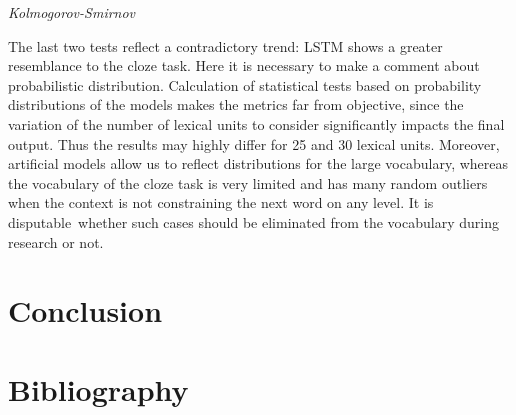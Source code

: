 \documentclass[a4paper]{article}
\newcommand{\head}[1]{\vspace{0.5em}\emph{#1}\vspace{0.25em}}
\begin{document}
\head{Kolmogorov-Smirnov}%

The last two tests reflect a contradictory trend: LSTM shows a greater resemblance to the cloze task. Here it is necessary to make a comment about probabilistic distribution. Calculation of statistical tests based on probability distributions of the models makes the metrics far from objective, since the variation of the number of lexical units to consider significantly impacts the final output. Thus the results may highly differ for 25 and 30 lexical units. Moreover, artificial models allow us to reflect distributions for the large vocabulary, whereas the vocabulary of the cloze task is very limited and has many random outliers when the context is not constraining the next word on any level. It is disputable whether such cases should be eliminated from the vocabulary during research or not.                          

\section{Conclusion}

\section{Bibliography}%


\end{document}
